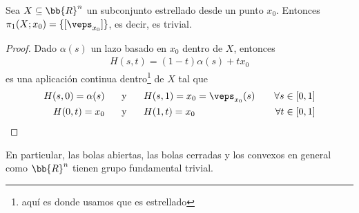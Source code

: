 \begin{ejemplo}
    Sea $X\subseteq \bb{R}^n$ un subconjunto estrellado desde un punto $x_0$. Entonces $\pi_1(X;x_0) = \{[\veps_{x_0}]\}$, es decir, es trivial.

    \begin{proof}
        Dado $\alpha(s)$ un lazo basado en $x_0$ dentro de $X$, entonces 
        \begin{gather*}
            H(s,t) = (1-t)\alpha(s)+tx_0
        \end{gather*}
        es una aplicación continua dentro\footnote{aquí es donde usamos que es estrellado} de $X$ tal que 
        \begin{align*}
            H(s,0) = \alpha(s) \hspace{0.5cm} &\text{ y } \hspace{0.5cm} H(s,1) = x_0 = \veps_{x_0}(s) \ \ \ &\forall s\in [0,1]\\
            H(0,t) = x_0  \hspace{0.5cm} &\text{ y } \hspace{0.5cm} H(1,t) = x_0\ \ \ &\forall t \in [0,1]
        \end{align*}
    \end{proof}
    En particular, las bolas abiertas, las bolas cerradas y los convexos en general como $\bb{R}^n$ tienen grupo fundamental trivial.
\end{ejemplo}

